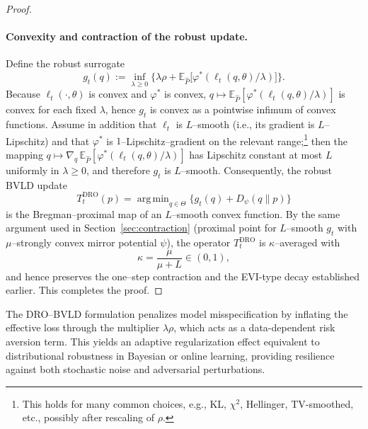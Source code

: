 \documentclass[11pt]{article}
\DeclareMathOperator*{\argmin}{arg\,min}
\theoremstyle{plain}
\theoremstyle{definition}
\theoremstyle{remark}
\newtheorem{remark}[theorem]{Remark}
\begin{document}
\begin{proof}
\paragraph{Convexity and contraction of the robust update.}
Define the robust surrogate
\[
g_t(q):=\inf_{\lambda\ge0}\Big\{
\lambda\rho+\mathbb E_{\hat P}\big[\varphi^*(\ell_t(q,\theta)/\lambda)\big]\Big\}.
\]
Because $\ell_t(\cdot,\theta)$ is convex and $\varphi^*$ is convex,  
$q\mapsto \mathbb E_{\hat P}[\varphi^*(\ell_t(q,\theta)/\lambda)]$ is convex for each fixed $\lambda$,  
hence $g_t$ is convex as a pointwise infimum of convex functions.  
Assume in addition that $\ell_t$ is $L$–smooth (i.e., its gradient is $L$–Lipschitz) and that $\varphi^*$ is $1$–Lipschitz–gradient on the relevant range;\footnote{This holds for many common choices, e.g., KL, $\chi^2$, Hellinger, TV-smoothed, etc., possibly after rescaling of $\rho$.}
then the mapping $q\mapsto \nabla_q\,\mathbb E_{\hat P}[\varphi^*(\ell_t(q,\theta)/\lambda)]$
has Lipschitz constant at most $L$ uniformly in $\lambda\ge0$, and therefore $g_t$ is $L$–smooth.
Consequently, the robust BVLD update
\[
T_t^{\mathrm{DRO}}(p)
=\argmin_{q\in\Theta}\Big\{g_t(q)+D_\psi(q\|p)\Big\}
\]
is the Bregman–proximal map of an $L$–smooth convex function.  
By the same argument used in Section~\ref{sec:contraction} (proximal point for $L$–smooth $g_t$ with $\mu$–strongly convex mirror potential $\psi$), the operator $T_t^{\mathrm{DRO}}$ is $\kappa$–averaged with
\[
\kappa=\frac{\mu}{\mu+L}\in(0,1),
\]
and hence preserves the one–step contraction and the EVI-type decay established earlier.  
This completes the proof.
\end{proof}


The DRO–BVLD formulation penalizes model misspecification by inflating 
the effective loss through the multiplier $\lambda\rho$, 
which acts as a data-dependent risk aversion term.  
This yields an adaptive regularization effect equivalent to 
distributional robustness in Bayesian or online learning, 
providing resilience against both stochastic noise and adversarial perturbations.

\end{document}
